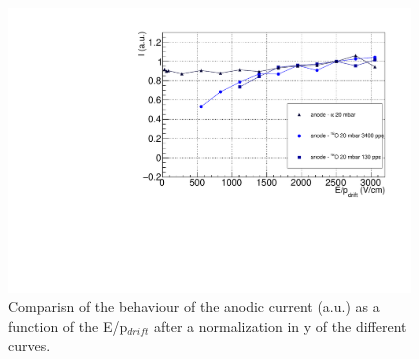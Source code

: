 \documentclass[a4paper, 11 pt]{report}
\newcommand{\Edrift}{E/p$_{drift}$}
\begin{document}
  \begin{figure}[htbp]
	\centering
	\includegraphics[width=0.95\textwidth]{Immagini/driftScan_FULL_20mbar_Comparison_F.pdf}
	\caption{Comparisn of the behaviour of the anodic current (a.u.) as a function of the \Edrift 
	after a normalization in y of the different curves.}
	\label{fig:DriftScan_FULL_beam}
  \end{figure}

  \clearpage
\end{document}
